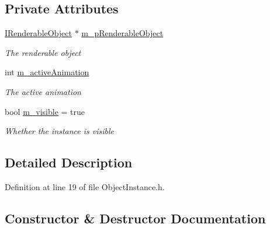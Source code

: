 \subsection*{Private Attributes}
\begin{DoxyCompactItemize}
\item 
\hyperlink{class_i_renderable_object}{I\+Renderable\+Object} $\ast$ \hyperlink{class_object_instance_a67070bfa6058a31558b406be673df000}{m\+\_\+p\+Renderable\+Object}
\begin{DoxyCompactList}\small\item\em The renderable object \end{DoxyCompactList}\item 
int \hyperlink{class_object_instance_afecd5e87b02f138d36e01b129e7edf68}{m\+\_\+active\+Animation}
\begin{DoxyCompactList}\small\item\em The active animation \end{DoxyCompactList}\item 
bool \hyperlink{class_object_instance_a42b286c70cd268899841162e35b854e1}{m\+\_\+visible} = true
\begin{DoxyCompactList}\small\item\em Whether the instance is visible \end{DoxyCompactList}\end{DoxyCompactItemize}


\subsection{Detailed Description}


Definition at line 19 of file Object\+Instance.\+h.



\subsection{Constructor \& Destructor Documentation}
